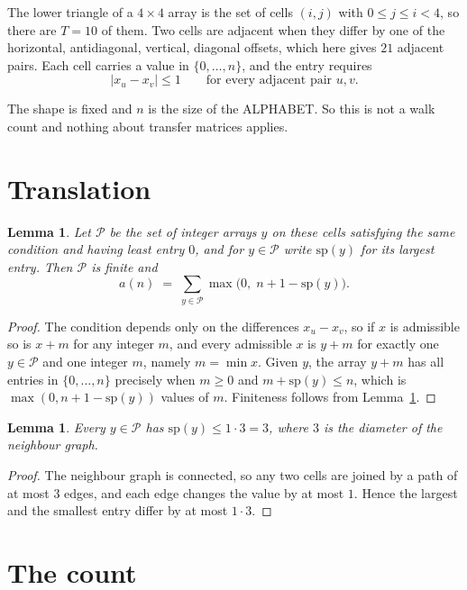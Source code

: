\documentclass[11pt,a4paper]{article}
\theoremstyle{plain}
\newtheorem{lemma}[theorem]{Lemma}
\theoremstyle{definition}
\begin{document}
The lower triangle of a $4\times4$ array is the set of cells $(i,j)$ with $0\le j\le
i<4$, so there are $T=10$ of them. Two cells are adjacent when they differ by one of the
horizontal, antidiagonal, vertical, diagonal offsets, which here gives $21$ adjacent pairs. Each cell carries a value in
$\{0,\dots,n\}$, and the entry requires
\[
|x_u-x_v|\le 1\qquad\text{for every adjacent pair }u,v .
\]

The shape is fixed and $n$ is the size of the ALPHABET. So this is not a walk count and
nothing about transfer matrices applies.

\section{Translation}

\begin{lemma}\label{lem:trans}
Let $\mathcal P$ be the set of integer arrays $y$ on these cells satisfying the same condition
and having least entry $0$, and for $y\in\mathcal P$ write $\mathrm{sp}(y)$ for its largest
entry. Then $\mathcal P$ is finite and
\[
a(n)\;=\;\sum_{y\in\mathcal P}\max\bigl(0,\;n+1-\mathrm{sp}(y)\bigr).
\]
\end{lemma}

\begin{proof}
The condition depends only on the differences $x_u-x_v$, so if $x$ is admissible so is $x+m$
for any integer $m$, and every admissible $x$ is $y+m$ for exactly one $y\in\mathcal P$ and one
integer $m$, namely $m=\min x$. Given $y$, the array $y+m$ has all entries in
$\{0,\dots,n\}$ precisely when $m\ge0$ and $m+\mathrm{sp}(y)\le n$, which is
$\max(0,n+1-\mathrm{sp}(y))$ values of $m$. Finiteness follows from
Lemma~\ref{lem:bound}.
\end{proof}

\begin{lemma}\label{lem:bound}
Every $y\in\mathcal P$ has $\mathrm{sp}(y)\le 1\cdot3=3$, where $3$ is the
diameter of the neighbour graph.
\end{lemma}

\begin{proof}
The neighbour graph is connected, so any two cells are joined by a path of at most $3$
edges, and each edge changes the value by at most $1$. Hence the largest and the smallest
entry differ by at most $1\cdot3$.
\end{proof}

\section{The count}
\end{document}

